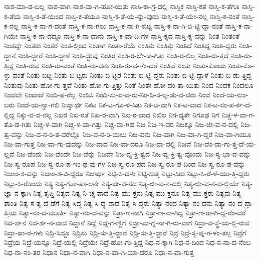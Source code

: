{ನಾಶ-ಮಾ-ಡ-ಬಲ್ಲ
ನಾಶ-ವಾಗಿ
ನಾಶ-ವಾ-ಗಿ-ಹೋ-ಯಿತು
ನಾಸಿ-ಕಾ-ಗ್ರ-ದಲ್ಲಿ
ನಾಸ್ತಿಕ
ನಾಸ್ತಿ-ಕತೆ
ನಾಸ್ತಿ-ಕ-ತೆಗೂ
ನಾಸ್ತಿ-ಕ-ತೆಯ
ನಾಸ್ತಿ-ಕ-ತೆ-ಯಿಂದ
ನಾಸ್ತಿ-ಕ-ತೆಯೂ
ನಾಸ್ತಿ-ಕ-ತೆ-ಯೆ-ನ್ನು-ವುದು
ನಾಸ್ತಿ-ಕ-ತೆ-ಯೇ-ನಲ್ಲ
ನಾಸ್ತಿ-ಕ-ನಂತೆ
ನಾಸ್ತಿ-ಕ-ನಲ್ಲ
ನಾಸ್ತಿ-ಕ-ನಾ-ಗ-ದಂತೆ
ನಾಸ್ತಿ-ಕ-ನಾ-ಗಲು
ನಾಸ್ತಿ-ಕ-ನಾ-ಗಿ-ಬಿಟ್ಟ
ನಾಸ್ತಿ-ಕ-ನಾ-ಗಿ-ಬಿ-ಟ್ಟಿ-ದ್ದಾ-ನಂತೆ
ನಾಸ್ತಿ-ಕ-ನಾ-ಗಿಯೇ
ನಾಸ್ತಿ-ಕ-ನಾ-ದದ್ದೂ
ನಾಸ್ತಿ-ಕ-ನಾ-ದಾನು
ನಾಸ್ತಿ-ಕ-ವಾ-ದಿ-ಗಳ
ನಾಸ್ತಿ-ಕ್ಯದ
ನಾಸ್ತಿ-ಕ್ಯ-ವನ್ನು
ನಿಂತ
ನಿಂತಂತೆ
ನಿಂತದ್ದೇ
ನಿಂತರು
ನಿಂತರೆ
ನಿಂತ-ಲ್ಲಿಂದ
ನಿಂತಾಗ
ನಿಂತಾ-ರೆಯೆ
ನಿಂತಿತು
ನಿಂತಿತ್ತು
ನಿಂತಿದೆ
ನಿಂತಿದ್ದ
ನಿಂತಿ-ದ್ದರು
ನಿಂತಿ-ದ್ದಾನೆ
ನಿಂತಿ-ದ್ದಾರೆ
ನಿಂತಿ-ದ್ದಾಳೆ
ನಿಂತಿ-ದ್ದುವು
ನಿಂತಿರ
ನಿಂತಿ-ರ-ಬೇ-ಕಾ-ಗಿತ್ತು
ನಿಂತಿ-ರ-ಲಿಲ್ಲ
ನಿಂತಿ-ರು-ತ್ತದೆ
ನಿಂತಿ-ರು-ತ್ತಿದ್ದ
ನಿಂತಿ-ರುವ
ನಿಂತಿ-ರು-ವಂತೆ
ನಿಂತಿ-ರು-ವನು
ನಿಂತಿ-ರು-ವ-ಳೆಂ-ದರೆ
ನಿಂತಿವೆ
ನಿಂತು
ನಿಂತು-ಕೊಂಡು
ನಿಂತು-ಕೊ-ಳ್ಳು-ವಂತೆ
ನಿಂತು-ಬಿಟ್ಟ
ನಿಂತು-ಬಿ-ಟ್ಟರು
ನಿಂತು-ಬಿ-ಟ್ಟರೆ
ನಿಂತು-ಬಿ-ಟ್ಟಿ-ದ್ದರು
ನಿಂತು-ಬಿ-ಟ್ಟಿ-ದ್ದಾಳೆ
ನಿಂತು-ಬಿ-ಡು-ತ್ತಿದ್ದ
ನಿಂತುವು
ನಿಂತು-ಹೋ-ಗು-ತ್ತವೆ
ನಿಂತು-ಹೋ-ಗು-ತ್ತಿತ್ತು
ನಿಂತೆ
ನಿಂತೇ-ಹೋ-ದಂ-ತಾ-ಯಿತು
ನಿಂದ
ನಿಂದಕ
ನಿಂದಲೂ
ನಿಂದಲೇ
ನಿಂದಾಚೆ
ನಿಂದಿ-ಪ-ರೆಲ್ಲ
ನಿಂದಿಸಿ
ನಿಂದಿ-ಸು-ವ-ವ-ರು-ನಿಂ-ದಿ-ಸ-ಲ್ಪ-ಡು-ವ-ವರು
ನಿಂದೆ
ನಿಂದೆ-ಯ-ನುಂ-ಬರು
ನಿಂದೆ-ಯ-ನ್ನಾ-ಗಲಿ
ನಿಃಸ್ವಾರ್ಥ
ನಿಕಟ
ನಿಕ-ಟ-ಗೊ-ಳಿ-ಸಿತು
ನಿಕ-ಟ-ವಾಗಿ
ನಿಕ-ಟ-ವಾದ
ನಿಕ-ಟ-ಸಂ-ಪ-ರ್ಕ-ದ-ಲ್ಲಿದ್ದ
ನಿಕ್ಕು-ವ-ವ-ನಲ್ಲ
ನಿಖರ
ನಿಖ-ರತೆ
ನಿಖ-ರ-ವಾಗಿ
ನಿಖ-ರ-ವಾದ
ನಿಖಿಲ
ನಿಗ-ದ್ಯತೇ
ನಿಗೂಢ
ನಿಗೆ
ನಿಚ್ಚ-ಳ-ವಾ-ಗ-ತೊ-ಡ-ಗಿತು
ನಿಚ್ಚ-ಳ-ವಾಗಿ
ನಿಚ್ಚ-ಳ-ವಾ-ಗಿತ್ತು
ನಿಚ್ಚ-ವಾ-ಗಿಹ
ನಿಜ
ನಿಜ-ಇ-ವರ
ನಿಜಕ್ಕೂ
ನಿಜ-ಜೀ-ವ-ನ-ದಲ್ಲಿ
ನಿಜ-ತ್ವ-ವನ್ನು
ನಿಜ-ವ-ನ-ರಿ-ತ-ವರೆಲ್ಲೊ
ನಿಜ-ವ-ನ-ರಿ-ಯಲು
ನಿಜ-ವನು
ನಿಜ-ವಾಗಿ
ನಿಜ-ವಾ-ಗಿ-ದ್ದರೆ
ನಿಜ-ವಾ-ಗಿಯೂ
ನಿಜ-ವಾ-ಗುತ್ತ
ನಿಜ-ವಾ-ಗು-ವುದನ್ನು
ನಿಜ-ವಾದ
ನಿಜ-ವಾ-ದರೂ
ನಿಜ-ವಾ-ದಲ್ಲಿ
ನಿಜವೆ
ನಿಜ-ವೆಂ-ದಾ-ಗು-ತ್ತ-ದೆ-ಯ-ಲ್ಲವೆ
ನಿಜ-ವೆಂದು
ನಿಜ-ವೆಂದೇ
ನಿಜ-ವೆನ್ನು
ನಿಜವೇ
ನಿಜ-ವ್ಯ-ಕ್ತಿ-ತ್ವದ
ನಿಜ-ವ್ಯ-ಕ್ತಿ-ತ್ವ-ವೊಂದು
ನಿಜ-ಸ್ವ-ಭಾ-ವ-ವನ್ನು
ನಿಜ-ಸ್ವ-ರೂಪ
ನಿಜ-ಸ್ವ-ರೂ-ಪ-ಇಂ-ಥ-ವು-ಗಳ
ನಿಜ-ಸ್ವ-ರೂ-ಪದ
ನಿಜ-ಸ್ವ-ರೂ-ಪ-ದಿಂದ
ನಿಜ-ಸ್ವ-ರೂ-ಪ-ವನ್ನು
ನಿಜಾಂ-ಶ-ವನ್ನು
ನಿಜಾಂ-ಶ-ವಿ-ದ್ದರೂ
ನಿಜಾರ್ಥ
ನಿಟ್ಟಿ-ಸಿ-ದಳು
ನಿಟ್ಟಿ-ಸುತ್ತ
ನಿಟ್ಟು-ಸಿರು
ನಿಟ್ಟು-ಸಿ-ರೆ-ಳೆ-ಯು-ತ್ತಿ-ದ್ದರು
ನಿಟ್ಟು-ಸಿ-ರೊಂದು
ನಿತ್ಯ
ನಿತ್ಯ-ಗೋ-ಪಾ-ಲನೇ
ನಿತ್ಯ-ಜೀ-ವ-ನದ
ನಿತ್ಯ-ಜೀ-ವ-ನ-ದಲ್ಲಿ
ನಿತ್ಯ-ಜೀ-ವ-ನ-ದ-ಲ್ಲಿಯೇ
ನಿತ್ಯ-ಜ್ಞಾ-ನ-ಕ್ಕಾಗಿ
ನಿತ್ಯ-ತೃಪ್ತಿ
ನಿತ್ಯದ
ನಿತ್ಯ-ನಿ-ಚ್ಚ-ವಾದ
ನಿತ್ಯ-ಮು-ಕ್ತನು
ನಿತ್ಯ-ಮು-ಕ್ತನೂ
ನಿತ್ಯ-ಮು-ಕ್ತರು
ನಿತ್ಯವು
ನಿತ್ಯ-ಶಾಂತಿ
ನಿತ್ಯ-ಸ-ತ್ಯ-ದೆ-ಡೆಗೆ
ನಿತ್ಯ-ಸಿದ್ಧ
ನಿತ್ಯ-ಸಿ-ದ್ಧ-ನಾದ
ನಿತ್ಯ-ಸಿ-ದ್ಧರು
ನಿತ್ಯಾ-ನಂದ
ನಿತ್ಯಾ-ನಂ-ದನು
ನಿತ್ಯಾ-ನಂ-ದ-ಪ್ರಾ-ಪ್ತಿಯ
ನಿತ್ಯಾ-ನಂ-ದ-ಮೂರ್ತಿ
ನಿತ್ಯಾ-ನಂ-ದ-ವನ್ನು
ನಿತ್ರಾ-ಣ-ನಾಗಿ
ನಿತ್ರಾ-ಣ-ನಾ-ಗಿದ್ದ
ನಿತ್ರಾ-ಣ-ರಾ-ಗಿ-ದ್ದ-ರೆಂ-ದರೆ
ನಿದ-ರ್ಶನ
ನಿದ-ರ್ಶ-ನ-ವಾದ
ನಿದ್ದಾನೆ
ನಿದ್ದೆ
ನಿದ್ದೆ-ಗ-ಣ್ಣಿಗೆ
ನಿದ್ರಾ-ಮ-ಗ್ನ-ನಾ-ಗಿ-ರು-ವಾಗ
ನಿದ್ರಾ-ವ-ಸ್ಥೆ-ಯ-ಲ್ಲಿ-ರುವ
ನಿದ್ರಾ-ಹಾ-ರ-ಗಳು
ನಿದ್ರಿ-ಸಿದ್ದೂ
ನಿದ್ರಿಸು
ನಿದ್ರಿ-ಸು-ತ್ತಿ-ದ್ದಾನೆ
ನಿದ್ರಿ-ಸು-ತ್ತಿ-ದ್ದಾರೆ
ನಿದ್ರೆ
ನಿದ್ರೆ-ಸ್ವ-ಪ್ನ-ಗ-ಳಂ-ತಲ್ಲ
ನಿದ್ರೆಗೆ
ನಿದ್ರೆಯ
ನಿದ್ರೆ-ಯನ್ನೂ
ನಿದ್ರೆ-ಯಲ್ಲಿ
ನಿದ್ರೆಯೇ
ನಿದ್ರೆ-ಹೋ-ಗು-ತ್ತಿದ್ದ
ನಿಧ-ನ-ಕ್ಕಾಗಿ
ನಿಧ-ನ-ದಿಂದ
ನಿಧ-ನ-ನಾ-ದ-ನೆಂಬ
ನಿಧ-ನಾ-ನಂ-ತರ
ನಿಧಾನ
ನಿಧಾ-ನ-ವಾಗಿ
ನಿಧಾ-ನ-ವಾ-ಗಿ-ಯಾ-ದರೂ
ನಿಧಾ-ನ-ವಾ-ಗುತ್ತ
}
